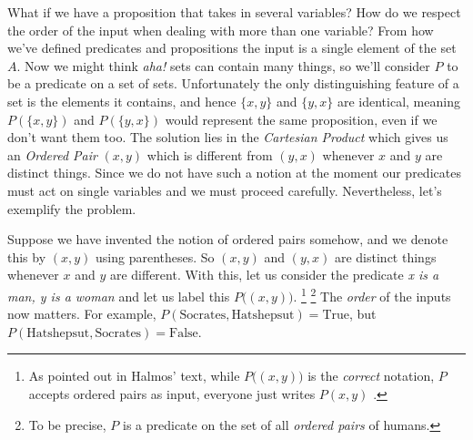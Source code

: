         What if we have a proposition that takes in several variables? How do we
        respect the order of the input when dealing with more than one variable?
        From how we've defined predicates and propositions the input
        is a single element of the set $A$. Now we might think \textit{aha!}
        sets can contain many things, so we'll consider $P$ to be a predicate on
        a set of sets. Unfortunately the only distinguishing feature of a set
        is the elements it contains, and hence $\{x,y\}$ and $\{y,x\}$ are
        identical, meaning $P(\{x,y\})$ and $P(\{y,x\})$ would represent the
        same proposition, even if we don't want them too. The solution lies in
        the \textit{Cartesian Product} which gives us
        an \textit{Ordered Pair} $(x,y)$ which is different
        from $(y,x)$ whenever $x$ and $y$ are distinct things. Since we do not
        have such a notion at the moment our predicates must act on single
        variables and we must proceed carefully. Nevertheless, let's exemplify
        the problem.
        \begin{example}
            Suppose we have invented the notion of ordered pairs somehow, and
            we denote this by $(x,y)$ using parentheses. So $(x,y)$ and $(y,x)$
            are distinct things whenever $x$ and $y$ are different. With this,
            let us consider the predicate \textit{x is a man, y is a woman} and
            let us label this $P\big((x,y)\big)$.%
            \footnote{%
                As pointed out in Halmos' text, while $P\big((x,y)\big)$ is the
                \textit{correct} notation, $P$ accepts ordered pairs as input,
                everyone just writes $P(x,y)$ \cite[p.~32]{Halmos1974}.
            }
            \footnote{%
                To be precise, $P$ is a predicate on the set of all
                \textit{ordered pairs} of humans.
            }
            The \textit{order} of the inputs now
            matters. For example,
            $P(\text{Socrates},\text{Hatshepsut})=\text{True}$, but
            $P(\text{Hatshepsut},\text{Socrates})=\text{False}$.
        \end{example}
